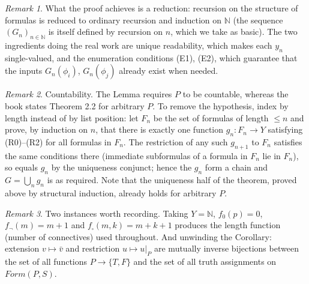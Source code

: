 \documentclass{article}
\theoremstyle{remark}\newtheorem{remark}{Remark}
\begin{document}
\begin{remark}
What the proof achieves is a reduction: recursion on the structure of formulas is reduced to ordinary recursion and induction on $\mathbb{N}$ (the sequence $(G_n)_{n \in \mathbb{N}}$ is itself defined by recursion on $n$, which we take as basic). The two ingredients doing the real work are unique readability, which makes each $y_n$ single-valued, and the enumeration conditions (E1), (E2), which guarantee that the inputs $G_n(\phi_i)$, $G_n(\phi_j)$ already exist when needed.
\end{remark}

\begin{remark}
Countability. The Lemma requires $P$ to be countable, whereas the book states Theorem 2.2 for arbitrary $P$. To remove the hypothesis, index by length instead of by list position: let $F_n$ be the set of formulas of length $\leq n$ and prove, by induction on $n$, that there is exactly one function $g_n \colon F_n \to Y$ satisfying (R0)--(R2) for all formulas in $F_n$. The restriction of any such $g_{n+1}$ to $F_n$ satisfies the same conditions there (immediate subformulas of a formula in $F_n$ lie in $F_n$), so equals $g_n$ by the uniqueness conjunct; hence the $g_n$ form a chain and $G = \bigcup_n g_n$ is as required. Note that the uniqueness half of the theorem, proved above by structural induction, already holds for arbitrary $P$.
\end{remark}

\begin{remark}
Two instances worth recording. Taking $Y = \mathbb{N}$, $f_0(p) = 0$, $f_{\neg}(m) = m + 1$ and $f_{\square}(m, k) = m + k + 1$ produces the length function (number of connectives) used throughout. And unwinding the Corollary: extension $v \mapsto \bar{v}$ and restriction $u \mapsto u|_P$ are mutually inverse bijections between the set of all functions $P \to \{T, F\}$ and the set of all truth assignments on $Form(P, S)$.
\end{remark}
\end{document}
